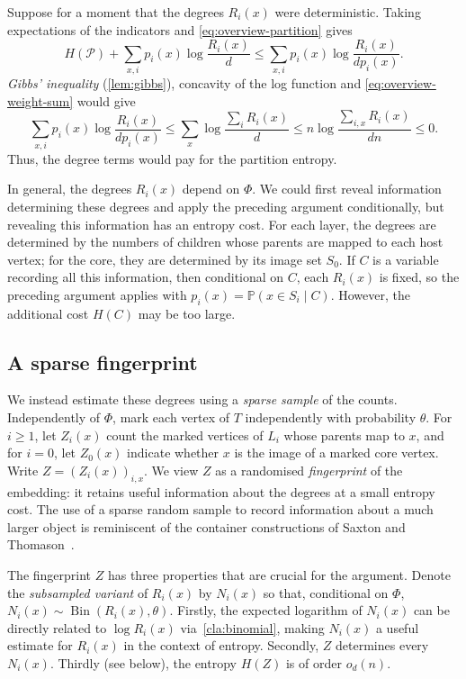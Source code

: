 \documentclass[reqno,final,a4paper]{amsart}
\numberwithin{equation}{section}
\theoremstyle{definition}
\theoremstyle{remark}
\DeclareMathOperator{\Bin}{Bin}
\begin{document}
Suppose for a moment that the degrees $R_i(x)$ were deterministic. Taking expectations of the indicators and \eqref{eq:overview-partition} gives
$$
H(\mathcal P)+\sum_{x,i}p_i(x)\log\frac{R_i(x)}d
\le \sum_{x,i}p_i(x)\log\frac{R_i(x)}{dp_i(x)}.
$$
\emph{Gibbs' inequality} (\cref{lem:gibbs}), concavity of the log function and \cref{eq:overview-weight-sum} would give
\[
    \sum_{x,i} p_i(x)\log\frac{R_i(x)}{dp_i(x)}\leq \sum_x\log\frac{\sum_iR_i(x)}{d}\leq n\log\frac{\sum_{i,x}R_i(x)}{dn}\leq 0.
\]
Thus, the degree terms would pay for the partition entropy.


In general, the degrees $R_i(x)$ depend on $\Phi$. We could first reveal information determining these degrees and apply the preceding argument conditionally, but revealing this information has an entropy cost. For each layer, the degrees are determined by the numbers of
children whose parents are mapped to each host vertex; for the
core, they are determined by its image set $S_0$. If $C$ is a variable recording all
this information, then conditional on $C$, each $R_i(x)$ is fixed, so the preceding argument applies with $p_i(x)=\mathbb P(x\in S_i\mid C)$. However, the additional cost $H(C)$ may be too large.

\subsection{A sparse fingerprint}\label{sec:fingerprint}
We instead estimate these degrees using a \textit{sparse sample} of the counts. Independently of $\Phi$, mark each vertex of $T$ independently with probability $\theta$. For $i\ge1$, let $Z_i(x)$ count the marked vertices of $L_i$ whose parents map to $x$, and for $i=0$, let $Z_0(x)$ indicate whether $x$ is the image of a marked core vertex. Write $Z=(Z_i(x))_{i,x}$. We view $Z$ as a randomised \emph{fingerprint} of the embedding:
it retains useful information about the degrees at a small
entropy cost. The use of a sparse random sample to record
information about a much larger object is reminiscent of
the container constructions of Saxton and
Thomason~\cite{SaxtonThomasonSimple}.

The fingerprint $Z$ has three properties that are crucial for the argument. Denote the \textit{subsampled variant} of $R_i(x)$ by  $N_i(x)$ so that, conditional on $\Phi$, $N_i(x) \sim \Bin (R_i(x), \theta)$. Firstly, the expected logarithm of $N_i(x)$ can be directly related to $\log R_i(x)$ via~\cref{cla:binomial}, making $N_i(x)$ a useful estimate for $R_i(x)$ in the context of entropy. Secondly, $Z$ determines every $N_i(x)$. Thirdly (see below), the entropy $H(Z)$ is of order $o_d(n)$.
\end{document}
